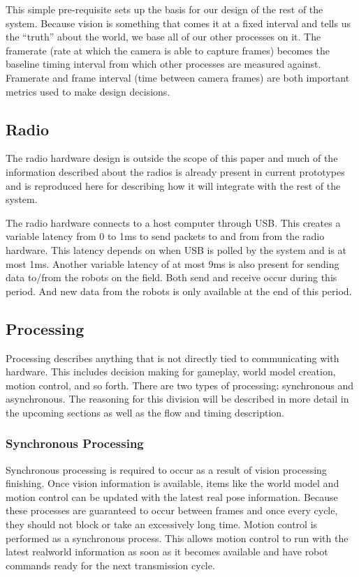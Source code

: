 \documentclass[letterpaper]{llncs}
\begin{document}
This simple pre-requisite sets up the basis for our design of the rest of the system. Because vision is something that comes it at a fixed interval and tells us the ``truth'' about the world, we base all of our other processes on it. The framerate (rate at which the camera is able to capture frames) becomes the baseline timing interval from which other processes are measured against. Framerate and frame interval (time between camera frames) are both important metrics used to make design decisions.

\subsection{Radio}
The radio hardware design is outside the scope of this paper and much of the information described about the radios is already present in current prototypes and is reproduced here for describing how it will integrate with the rest of the system.

The radio hardware connects to a host computer through USB. This creates a variable latency from 0 to 1ms to send packets to and from from the radio hardware. This latency depends on when USB is polled by the system and is at most 1ms. Another variable latency of at most 9ms is also present for sending data to/from the robots on the field. Both send and receive occur during this period. And new data from the robots is only available at the end of this period.

\subsection{Processing}
Processing describes anything that is not directly tied to communicating with hardware. This includes decision making for gameplay, world model creation, motion control, and so forth. There are two types of processing: synchronous and asynchronous. The reasoning for this division will be described in more detail in the upcoming sections as well as the flow and timing description.

\subsubsection{Synchronous Processing}
Synchronous processing is required to occur as a result of vision processing finishing. Once vision information is available, items like the world model and motion control can be updated with the latest real pose information. Because these processes are guaranteed to occur between frames and once every cycle, they should not block or take an excessively long time. Motion control is performed as a synchronous process. This allows motion control to run with the latest realworld information as soon as it becomes available and have robot commands ready for the next transmission cycle.
\end{document}
